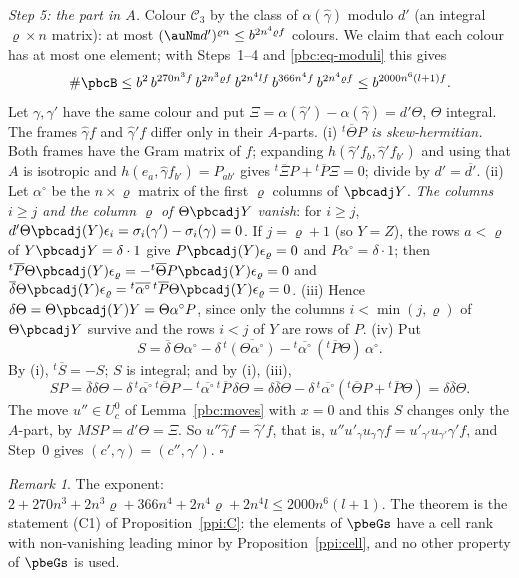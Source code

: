 \documentclass[10pt]{amsart}
\theoremstyle{definition}
\theoremstyle{remark}
\newtheorem{remark}[theorem]{Remark}
\providecommand{\aubar}[1]{\overline{#1}}
\begin{document}
\emph{Step 5: the part in $A$.} Colour $\mathcal C_3$ by the class of $\alpha(\hat\gamma)$ modulo $d'$ (an
integral $\varrho\times n$ matrix): at most $(\auNm d')^{\varrho n}\le b^{2n^4\varrho f}$ colours. We claim
that each colour has at most one element; with Steps~1--4 and \eqref{pbc:eq-moduli} this gives
\[
\#\pbcB\le b^{2}\,b^{270n^3f}\,b^{2n^3\varrho f}\,b^{2n^4lf}\,b^{366n^4f}\,b^{2n^4\varrho f}\le
b^{2000n^6(l+1)f}.
\]
Let $\gamma,\gamma'$ have the same colour and put $\Xi=\alpha(\hat\gamma')-\alpha(\hat\gamma)=d'\Theta$, $\Theta$
integral. The frames $\hat\gamma f$ and $\hat\gamma'f$ differ only in their $A$-parts. (i) \emph{${}^t\aubar
\Theta P$ is skew-hermitian.} Both frames have the Gram matrix of $f$; expanding $h(\hat\gamma'f_b,\hat\gamma'
f_{b'})$ and using that $A$ is isotropic and $h(e_a,\hat\gamma f_{b'})=P_{ab'}$ gives ${}^t\aubar\Xi P+
{}^t\aubar P\Xi=0$; divide by $d'=\aubar{d'}$. (ii) Let $\alpha^\circ$ be the $n\times\varrho$ matrix of the
first $\varrho$ columns of $\pbcadj Y$. \emph{The columns $i\ge j$ and the column $\varrho$ of $\Theta\pbcadj Y$
vanish}: for $i\ge j$, $d'\Theta\pbcadj(Y)\epsilon_i=\sigma_i(\gamma')-\sigma_i(\gamma)=0$. If $j=\varrho+1$ (so
$Y=Z$), the rows $a<\varrho$ of $Y\pbcadj Y=\delta\cdot1$ give $P\pbcadj(Y)\epsilon_\varrho=0$ and $P\alpha^\circ
=\delta\cdot1$; then ${}^t\aubar P\Theta\pbcadj(Y)\epsilon_\varrho=-{}^t\aubar \Theta P\pbcadj(Y)\epsilon_\varrho=0$ and
$\aubar\delta \Theta\pbcadj(Y)\epsilon_\varrho={}^t\aubar{\alpha^\circ}\,{}^t\aubar P\Theta\pbcadj(Y)\epsilon_\varrho=0$.
(iii) Hence $\delta \Theta=\Theta\pbcadj(Y)Y=\Theta\alpha^\circ P$, since only the columns $i<\min(j,\varrho)$ of
$\Theta\pbcadj Y$ survive and the rows $i<j$ of $Y$ are rows of $P$. (iv) Put
\[
S=\aubar\delta\,\Theta\alpha^\circ-\delta\,{}^t\aubar{(\Theta\alpha^\circ)}-{}^t\aubar{\alpha^\circ}\,({}^t\aubar
P\Theta)\,\alpha^\circ .
\]
By (i), ${}^t\aubar S=-S$; $S$ is integral; and by (i), (iii),
\[
SP=\aubar\delta\delta \Theta-\delta\,{}^t\aubar{\alpha^\circ}\,{}^t\aubar\Theta P-{}^t\aubar{\alpha^\circ}\,{}^t
\aubar P\,\delta \Theta=\delta\aubar\delta \Theta-\delta\,{}^t\aubar{\alpha^\circ}({}^t\aubar \Theta P+{}^t\aubar P\Theta)=\delta
\aubar\delta \Theta .
\]
The move $u''\in U_c^0$ of Lemma~\ref{pbc:moves} with $x=0$ and this $S$ changes only the $A$-part, by
$MSP=d'\Theta=\Xi$. So $u''\hat\gamma f=\hat\gamma'f$, that is, $u''u'_\gamma u_\gamma\gamma f=u'_{\gamma'}
u_{\gamma'}\gamma'f$, and Step~0 gives $(c',\gamma)=(c'',\gamma')$. \hfill$\square$

\begin{remark}\label{pbc:rem-C1}
The exponent: $2+270n^3+2n^3\varrho+366n^4+2n^4\varrho+2n^4l\le2000n^6(l+1)$. The theorem is the
statement (C1) of Proposition~\ref{ppi:C}: the elements of $\pbeGs$ have a cell rank with non-vanishing
leading minor by Proposition~\ref{ppi:cell}, and no other property of $\pbeGs$ is used.
\end{remark}
\end{document}
